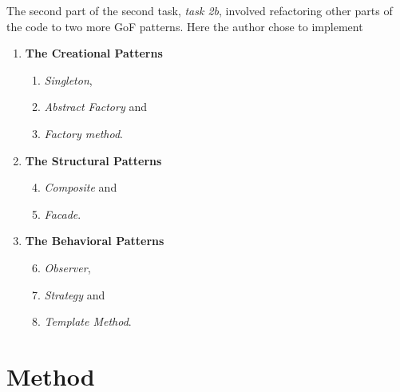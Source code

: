 \documentclass[a4paper]{scrreprt}
\begin{document}
The second part of the second task, \emph{task 2b}, involved refactoring other parts of
the code to two more GoF patterns.
Here the author chose to implement
\begin{enumerate}
\item \textbf{The Creational Patterns}
\begin{enumerate}
    \item \emph{Singleton},
    \item \emph{Abstract Factory} and
    \item \emph{Factory method}.
\end{enumerate}
\item \textbf{The Structural Patterns}
\begin{enumerate}
    \setcounter{enumi}{3}
    \item \emph{Composite} and
    \item \emph{Facade}.
\end{enumerate}
\item \textbf{The Behavioral Patterns}
\begin{enumerate}
    \setcounter{enumi}{5}
    \item \emph{Observer},
    \item \emph{Strategy} and
    \item \emph{Template Method}.
\end{enumerate}
\end{enumerate}






\chapter{Method}
\end{document}
